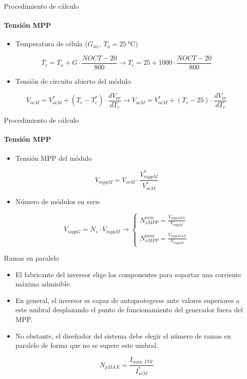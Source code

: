 \documentclass[aspectratio=169, usenames,svgnames,dvipsnames]{beamer}
\begin{document}
\begin{frame}[label={sec:org856645a}]{Procedimiento de cálculo}
\framesubtitle{Tensión MPP}
\begin{itemize}
\item Temperatura de célula (\(G_{stc},\, T_{a}=\SI{25}{\celsius}\))
\end{itemize}
\[
  T_{c} = T_{a} + G \cdot \frac{NOCT-20}{800} \rightarrow T_{c} = 25 + 1000 \cdot \frac{NOCT-20}{800}
\]
\begin{itemize}
\item Tensión de circuito abierto del módulo
\end{itemize}
\[
  V_{ocM} = V_{ocM}^{*} + (T_{c}-T_{c}^{*})\cdot\frac{dV_{oc}}{dT_{c}} \rightarrow
  V_{ocM} = V_{ocM}^{*} + (T_{c}- 25)\cdot\frac{dV_{oc}}{dT_{c}}
\]
\end{frame}
\begin{frame}[label={sec:org72ed904}]{Procedimiento de cálculo}
\framesubtitle{Tensión MPP}

\begin{itemize}
\item Tensión MPP del módulo
\end{itemize}
\[
  V_{mppM} = V_{ocM} \cdot \frac{V_{mppM}^*}{V_{ocM}^*}
\]
\begin{itemize}
\item Número de módulos en serie
\end{itemize}
\[
  V_{mppG} = N_s \cdot V_{mppM} \rightarrow
  \begin{cases}
    N_{sMPP}^{min} =\frac{V_{mppMIN}}{V_{mppM}}\\
    \\
    N_{sMPP}^{max} = \frac{V_{mppMAX}}{V_{mppM}}
  \end{cases}
\]
\end{frame}
\begin{frame}[label={sec:org42257d9}]{Ramas en paralelo}
\begin{itemize}
\item El fabricante del inversor elige los componentes para soportar una \alert{corriente máxima admisible}.

\item En general, el inversor es capaz de autoprotegerse ante valores superiores a este umbral desplazando el punto de funcionamiento del generador fuera del MPP.

\item No obstante, el diseñador del sistema debe elegir el número de ramas en paralelo de forma que no se supere este umbral.
\end{itemize}

\[
    N_{pMAX}=\frac{I_{max,INV}}{I_{scM}^{*}}
\]
\end{frame}
\end{document}
